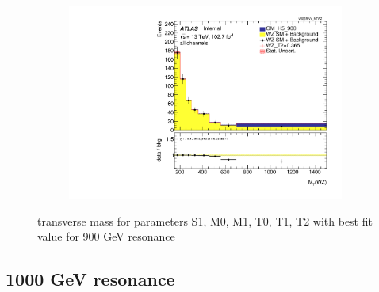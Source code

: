 \documentclass[../Bachelorarbeit.tex]{subfiles}
\begin{document}
\begin{figure}[h]
\begin{subfigure}{0.35\textwidth}
    \end{subfigure}
    \begin{subfigure}{0.35\textwidth}
        \includegraphics[width=\textwidth]{Plots/ALL_MTWZ_right_color/GM_H5_900/T2/2022-05-07/VBSSR/all_VV_MTWZ.pdf}
    \end{subfigure}

    \caption{transverse mass for parameters S1, M0, M1, T0, T1, T2 with best fit value for 900 GeV resonance}
    \label{fig:all_mtwz_900}
\end{figure}
\clearpage

\subsection{1000 GeV resonance}
\end{document}
